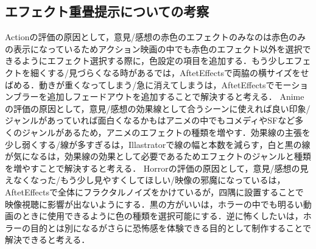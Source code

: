 \subsection{エフェクト重畳提示についての考察}
Actionの評価の原因として，意見/感想の赤色のエフェクトのみなのは赤色のみの表示になっているためアクション映画の中でも赤色のエフェクト以外を選択できるようにエフェクト選択する際に，色設定の項目を追加する．もう少しエフェクトを細くする/見づらくなる時があるでは，AftetEffectsで両脇の横サイズをせばめる．動きが重くなってしまう/急に消えてしまうは，AftetEffectsでモーションブラーを追加しフェードアウトを追加することで解決すると考える．
Animeの評価の原因として，意見/感想の効果線として合うシーンに使えれば良い印象/ジャンルがあっていれば面白くなるかもはアニメの中でもコメディやSFなど多くのジャンルがあるため，アニメのエフェクトの種類を増やす．効果線の主張を少し弱くする/線が多すぎるは，Illastratorで線の幅と本数を減らす，白と黒の線が気になるは，効果線の効果として必要であるためエフェクトのジャンルと種類を増やすことで解決すると考える．
Horrorの評価の原因として，意見/感想の見えなくなった/もう少し見やすくしてほしい/映像の邪魔になっているは，AftetEffectsで全体にフラクタルノイズをかけているが，四隅に設置することで映像視聴に影響が出ないようにする．黒の方がいいは，ホラーの中でも明るい動画のときに使用できるように色の種類を選択可能にする．逆に怖くしたいは，ホラーの目的とは別になるがさらに恐怖感を体験できる目的として制作することで解決できると考える．
